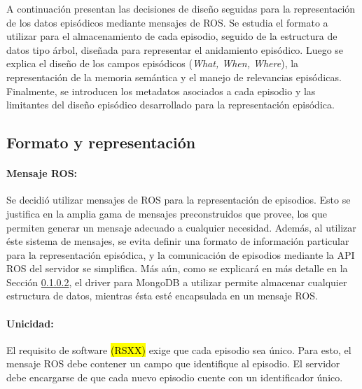 
A continuación presentan las decisiones de diseño seguidas para la representación de los datos episódicos mediante mensajes de ROS. Se estudia el formato a utilizar para el almacenamiento de cada episodio, seguido de la estructura de datos tipo árbol, diseñada para representar el anidamiento episódico. Luego se explica el diseño de los campos episódicos (\textit{What, When, Where}), la representación de la memoria semántica y el manejo de relevancias episódicas. Finalmente, se introducen los metadatos asociados a cada episodio y las limitantes del diseño episódico desarrollado para la representación episódica.



\subsection{Formato y representación}

\paragraph{Mensaje ROS:}
Se decidió utilizar mensajes de ROS para la representación de episodios. Esto se justifica en la amplia gama de mensajes preconstruidos que provee, los que permiten generar un mensaje adecuado a cualquier necesidad. Además, al utilizar éste sistema de mensajes, se evita definir una formato de información particular para la representación episódica, y la comunicación de episodios mediante la API ROS del servidor se simplifica. Más aún, como se explicará en más detalle en la Sección \ref{}, el driver para MongoDB a utilizar permite almacenar cualquier estructura de datos, mientras ésta esté encapsulada en un mensaje ROS.

\paragraph{Unicidad:}
El requisito de software \hl{(RSXX)} exige que cada episodio sea único. Para esto, el mensaje ROS debe contener un campo que identifique al episodio. El servidor debe encargarse de que cada nuevo episodio cuente con un identificador único.

